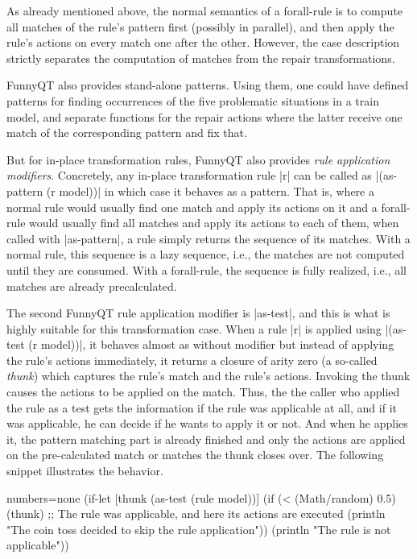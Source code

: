 \documentclass[submission]{eptcs}
\newcommand{\code}{\clojureinline}
\begin{document}
As already mentioned above, the normal semantics of a forall-rule is to compute
all matches of the rule's pattern first (possibly in parallel), and then apply
the rule's actions on every match one after the other.  However, the case
description strictly separates the computation of matches from the repair
transformations.

FunnyQT also provides stand-alone patterns.  Using them, one could have defined
patterns for finding occurrences of the five problematic situations in a train
model, and separate functions for the repair actions where the latter receive
one match of the corresponding pattern and fix that.

But for in-place transformation rules, FunnyQT also provides \emph{rule
  application modifiers}.  Concretely, any in-place transformation rule
\code|r| can be called as \code|(as-pattern (r model))| in which case it
behaves as a pattern.  That is, where a normal rule would usually find one
match and apply its actions on it and a forall-rule would usually find all
matches and apply its actions to each of them, when called with
\code|as-pattern|, a rule simply returns the sequence of its matches.  With a
normal rule, this sequence is a lazy sequence, i.e., the matches are not
computed until they are consumed.  With a forall-rule, the sequence is fully
realized, i.e., all matches are already precalculated.

The second FunnyQT rule application modifier is \code|as-test|, and this is
what is highly suitable for this transformation case.  When a rule \code|r| is
applied using \code|(as-test (r model))|, it behaves almost as without modifier
but instead of applying the rule's actions immediately, it returns a closure of
arity zero (a so-called \emph{thunk}) which captures the rule's match and the
rule's actions.  Invoking the thunk causes the actions to be applied on the
match.  Thus, the the caller who applied the rule as a test gets the
information if the rule was applicable at all, and if it was applicable, he can
decide if he wants to apply it or not.  And when he applies it, the pattern
matching part is already finished and only the actions are applied on the
pre-calculated match or matches the thunk closes over.  The following snippet
illustrates the behavior.

\begin{clojurecode*}{numbers=none}
(if-let [thunk (as-test (rule model))]
  (if (< (Math/random) 0.5)
    (thunk) ;; The rule was applicable, and here its actions are executed
    (println "The coin toss decided to skip the rule application"))
  (println "The rule is not applicable"))
\end{clojurecode*}
\end{document}
